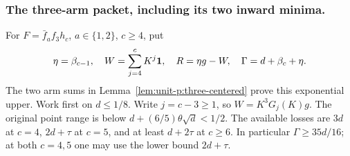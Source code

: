 \subsubsection{The three-arm packet, including its two inward minima.}\label{part:unit-p:three-single}
For \(F=\bar f_af_3h_c\), \(a\in\{1,2\}\), \(c\ge4\), put
\begin{equation}\label{eq:unit-p:data-9}
\eta=\beta_{c-1},\quad W=\sum_{j=4}^cK^j\mathbf1,\quad
 R=\eta g-W,\quad \Gamma=d+\beta_c+\eta .
\end{equation}
The two arm sums in Lemma~\ref{lem:unit-p:three-centered} prove
this exponential upper. Work first on \(d\le1/8\).
Write \(j=c-3\ge1\), so \(W=K^3G_j(K)g\).
The original point range is below \(d+(6/5)\theta\sqrt d<1/2\).
The available losses are \(3d\) at \(c=4\),
\(2d+\tau\) at \(c=5\), and at least \(d+2\tau\) at \(c\ge6\).
In particular \(\Gamma\ge35d/16\); at both \(c=4,5\) one
may use the lower bound \(2d+\tau\).

